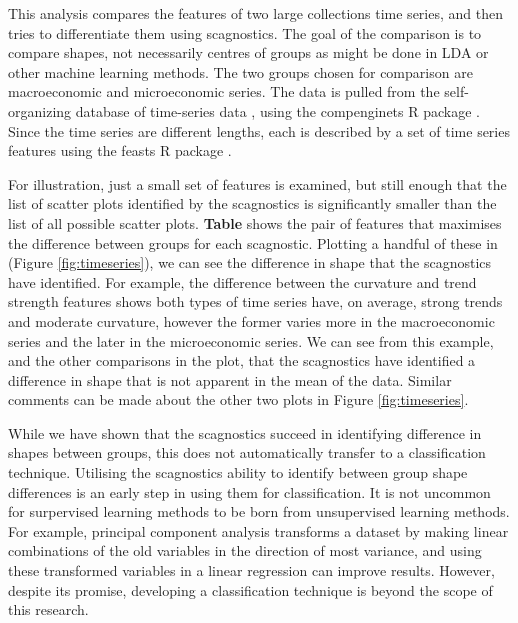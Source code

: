 This analysis compares the features of two large collections time
series, and then tries to differentiate them using scagnostics. The goal
of the comparison is to compare shapes, not necessarily centres of
groups as might be done in LDA or other machine learning methods. The
two groups chosen for comparison are macroeconomic and microeconomic
series. The data is pulled from the self-organizing database of
time-series data \citep{sots}, using the compenginets R package
\citep{compenginets}. Since the time series are different lengths, each
is described by a set of time series features \citep[chapter 4
of][]{fpp} using the feasts R package \citep{feasts}.

For illustration, just a small set of features is examined, but still
enough that the list of scatter plots identified by the scagnostics is
significantly smaller than the list of all possible scatter plots.
\textbf{Table} shows the pair of features that maximises the difference
between groups for each scagnostic. Plotting a handful of these in
(Figure \ref{fig:timeseries}), we can see the difference in shape that
the scagnostics have identified. For example, the difference between the
curvature and trend strength features shows both types of time series
have, on average, strong trends and moderate curvature, however the
former varies more in the macroeconomic series and the later in the
microeconomic series. We can see from this example, and the other
comparisons in the plot, that the scagnostics have identified a
difference in shape that is not apparent in the mean of the data.
Similar comments can be made about the other two plots in Figure
\ref{fig:timeseries}.

While we have shown that the scagnostics succeed in identifying
difference in shapes between groups, this does not automatically
transfer to a classification technique. Utilising the scagnostics
ability to identify between group shape differences is an early step in
using them for classification. It is not uncommon for surpervised
learning methods to be born from unsupervised learning methods. For
example, principal component analysis transforms a dataset by making
linear combinations of the old variables in the direction of most
variance, and using these transformed variables in a linear regression
can improve results. However, despite its promise, developing a
classification technique is beyond the scope of this research.

